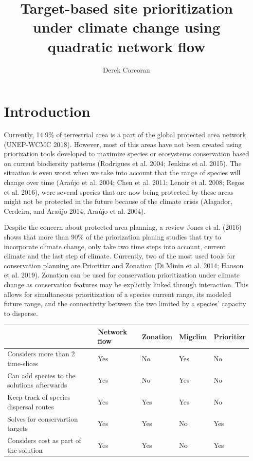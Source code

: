 \documentclass[]{article}
\title{Target-based site prioritization under climate change using quadratic network flow}
\author{Derek Corcoran}
\date{}
\begin{document}
\maketitle

\hypertarget{introduction}{%
\section{Introduction}\label{introduction}}

Currently, 14.9\% of terrestrial area is a part of the global protected area network (UNEP-WCMC 2018). However, most of this areas have not been created using priorization tools developed to maximize species or ecosystems conservation based on current biodiersity patterns (Rodrigues et al. 2004; Jenkins et al. 2015). The situation is even worst when we take into account that the range of species will change over time (Araújo et al. 2004; Chen et al. 2011; Lenoir et al. 2008; Regos et al. 2016), were several species that are now being protected by these areas might not be protected in the future because of the climate crisis (Alagador, Cerdeira, and Araújo 2014; Araújo et al. 2004).

Despite the concern about protected area planning, a review Jones et al. (2016) shows that more than 90\% of the priorization planing studies that try to incorporate climate change, only take two time steps into account, current climate and the last step of climate. Currently, two of the most used tools for conservation planning are Prioritizr and Zonation (Di Minin et al. 2014; Hanson et al. 2019). Zonation can be used for conservation prioritization under climate change as conservation features may be explicitly linked through interaction. This allows for simultaneous prioritization of a species current range, its modeled future range, and the connectivity between the two limited by a species' capacity to disperse.

\begin{table}[H]
\centering
\begin{tabular}{lllll}
\toprule
 & Network flow & Zonation & Migclim & Prioritizr\\
\midrule
Considers more than 2 time-slices & Yes & No & Yes & No\\
Can add species to the solutions afterwards & Yes & No & Yes & No\\
Keep track of species dispersal routes & Yes & Yes & Yes & No\\
Solves for conservartion targets & Yes & Yes & No & Yes\\
Considers cost as part of the solution & Yes & Yes & No & Yes\\
\bottomrule
\end{tabular}
\end{table}
\end{document}
